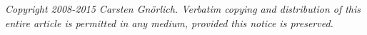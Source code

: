 \documentclass[12pt,a4paper,twoside]{article}
\begin{document}
\vfill
\begin{center}
{\em 
Copyright 2008-2015 Carsten Gnörlich.
Verbatim copying and distribution of this entire article is permitted in any medium, 
provided this notice is preserved.}
\end{center}

\newpage
\nopagecolor





\tableofcontents
\newpage









\appendix






\end{document}
